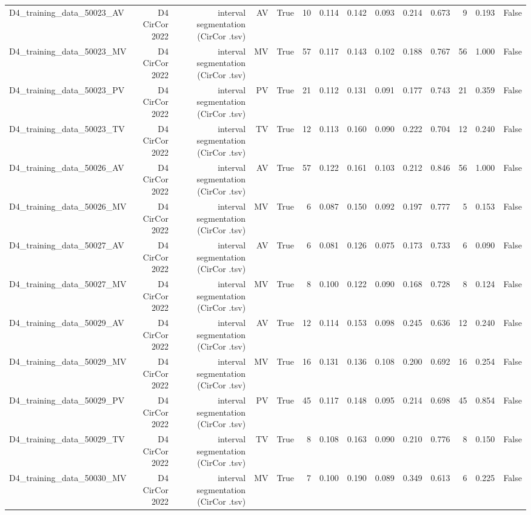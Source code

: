\begin{table}[htbp]
\begin{tabular}{lrrrrrrrrrrrrr}
    D4\_training\_data\_50023\_AV & D4 CirCor 2022 & interval segmentation (CirCor .tsv) & AV & True & 10 & 0.114 & 0.142 & 0.093 & 0.214 & 0.673 & 9 & 0.193 & False \\
    D4\_training\_data\_50023\_MV & D4 CirCor 2022 & interval segmentation (CirCor .tsv) & MV & True & 57 & 0.117 & 0.143 & 0.102 & 0.188 & 0.767 & 56 & 1.000 & False \\
    D4\_training\_data\_50023\_PV & D4 CirCor 2022 & interval segmentation (CirCor .tsv) & PV & True & 21 & 0.112 & 0.131 & 0.091 & 0.177 & 0.743 & 21 & 0.359 & False \\
    D4\_training\_data\_50023\_TV & D4 CirCor 2022 & interval segmentation (CirCor .tsv) & TV & True & 12 & 0.113 & 0.160 & 0.090 & 0.222 & 0.704 & 12 & 0.240 & False \\
    D4\_training\_data\_50026\_AV & D4 CirCor 2022 & interval segmentation (CirCor .tsv) & AV & True & 57 & 0.122 & 0.161 & 0.103 & 0.212 & 0.846 & 56 & 1.000 & False \\
    D4\_training\_data\_50026\_MV & D4 CirCor 2022 & interval segmentation (CirCor .tsv) & MV & True & 6 & 0.087 & 0.150 & 0.092 & 0.197 & 0.777 & 5 & 0.153 & False \\
    D4\_training\_data\_50027\_AV & D4 CirCor 2022 & interval segmentation (CirCor .tsv) & AV & True & 6 & 0.081 & 0.126 & 0.075 & 0.173 & 0.733 & 6 & 0.090 & False \\
    D4\_training\_data\_50027\_MV & D4 CirCor 2022 & interval segmentation (CirCor .tsv) & MV & True & 8 & 0.100 & 0.122 & 0.090 & 0.168 & 0.728 & 8 & 0.124 & False \\
    D4\_training\_data\_50029\_AV & D4 CirCor 2022 & interval segmentation (CirCor .tsv) & AV & True & 12 & 0.114 & 0.153 & 0.098 & 0.245 & 0.636 & 12 & 0.240 & False \\
    D4\_training\_data\_50029\_MV & D4 CirCor 2022 & interval segmentation (CirCor .tsv) & MV & True & 16 & 0.131 & 0.136 & 0.108 & 0.200 & 0.692 & 16 & 0.254 & False \\
    D4\_training\_data\_50029\_PV & D4 CirCor 2022 & interval segmentation (CirCor .tsv) & PV & True & 45 & 0.117 & 0.148 & 0.095 & 0.214 & 0.698 & 45 & 0.854 & False \\
    D4\_training\_data\_50029\_TV & D4 CirCor 2022 & interval segmentation (CirCor .tsv) & TV & True & 8 & 0.108 & 0.163 & 0.090 & 0.210 & 0.776 & 8 & 0.150 & False \\
    D4\_training\_data\_50030\_MV & D4 CirCor 2022 & interval segmentation (CirCor .tsv) & MV & True & 7 & 0.100 & 0.190 & 0.089 & 0.349 & 0.613 & 6 & 0.225 & False \\

\end{tabular}
\end{table}
